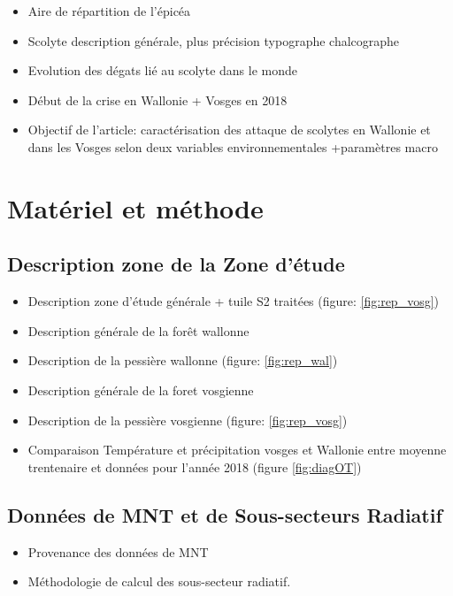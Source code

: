 \documentclass[3p,times]{elsarticle}
\begin{document}
\begin{itemize}
	\item Aire de répartition de l'épicéa
	\item Scolyte description générale, plus précision typographe chalcographe
	\item Evolution des dégats lié au scolyte dans le monde
	\item Début de la crise en Wallonie + Vosges en 2018
	\item Objectif de l'article: caractérisation des attaque de scolytes en Wallonie et dans les Vosges selon deux variables environnementales +paramètres macro 
\end{itemize}

\section{Matériel et méthode}

\subsection{Description zone de la Zone d'étude}

\begin{itemize}
	\item Description zone d'étude générale + tuile S2 traitées (figure: \ref{fig:rep_vosg}) 
	\item Description générale de la forêt wallonne 
	\item Description de la pessière wallonne (figure: \ref{fig:rep_wal})
	\item Description générale de la foret vosgienne 
	\item Description de la pessière vosgienne (figure: \ref{fig:rep_vosg})
	\item Comparaison Température et précipitation vosges et Wallonie entre moyenne trentenaire et données pour l'année 2018 (figure \ref{fig:diagOT})
	
\end{itemize}



\subsection{Données de MNT et de Sous-secteurs Radiatif}

\begin{itemize}
	\item Provenance des données de MNT
	\item Méthodologie de calcul des sous-secteur radiatif.
\end{itemize}
\end{document}
